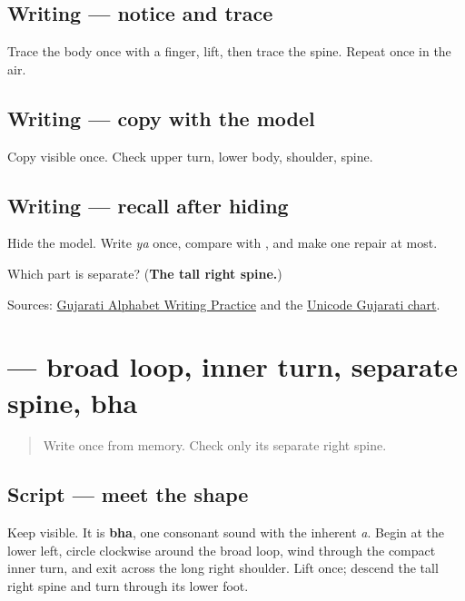 \subsection*{Writing — notice and trace}

Trace the body once with a finger, lift, then trace the spine. Repeat once in the air.

\subsection*{Writing — copy with the model}
Copy visible \textbf{} once. Check upper turn, lower body, shoulder, spine.

\subsection*{Writing — recall after hiding}
Hide the model. Write \emph{ya} once, compare with \textbf{}, and make one repair at most.

\begin{tcolorbox}[breakable,colback=teal!4,colframe=teal!35!black,title={Before you move on}]
Which part is separate? (\textbf{The tall right spine.})

Sources: \href{https://www.t30apps.com/gujarati-alphabet-writing/}{Gujarati Alphabet Writing Practice} and the \href{https://www.unicode.org/charts/PDF/U0A80.pdf}{Unicode Gujarati chart}.
\end{tcolorbox}
\section[\texorpdfstring{\gu{ભ} (bha)}{ભ (bha)}]{ — broad loop, inner turn, separate spine, bha}

\label{lesson:GU-W02-bha}



\begin{quote}
Write \textbf{} once from memory. Check only its separate right spine.
\end{quote}

\subsection*{Script — meet the shape}
Keep \textbf{} visible. It is \textbf{bha}, one consonant sound with the inherent \emph{a}. Begin at the lower left, circle clockwise around the broad loop, wind through the compact inner turn, and exit across the long right shoulder. Lift once; descend the tall right spine and turn through its lower foot.

